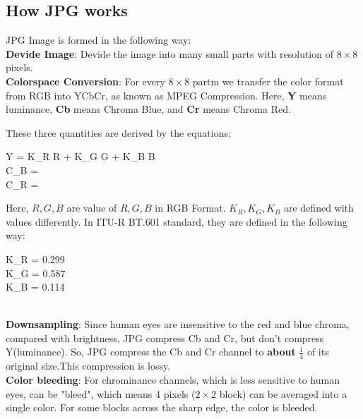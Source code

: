 \documentclass{article}
\begin{document}
	\subsection{How JPG works}
	JPG Image is formed in the following way:\\
	

	\textbf{Devide Image}:
	Devide the image into many small parts with resolution of $8 \times 8$ pixels.\\

  \textbf{Colorspace Conversion}:
	For every $8 \times 8$ partm we transfer the color format from RGB into YCbCr, as known as MPEG Compression. Here, \textbf{Y} means luminance, \textbf{Cb} means Chroma Blue, and \textbf{Cr} means Chroma Red.

	These three quantities are derived by the equations: \\


	\begin{eqnarry}
	Y = K_R \cdot R + K_G \cdot G + K_B \cdot B \\
	C_B =  \cdot {} \\
	C_R =  \cdot {} \\
	\end{eqnarry}


	Here, $R, G, B$ are value of $R,G,B$ in RGB Format. $K_R, K_G, K_B$ are defined with values differently. In ITU-R BT.601 standard, they are defined in the following way: \\


	\begin{eqnarry}
	K_R = 0.299 \\
	K_G = 0.587 \\
	K_B = 0.114 \\
	\end{eqnarry}

\cite{ref3} \\

	\textbf{Downsampling}:
		Since human eyes are insensitive to the red and blue chroma, compared with brightness, JPG compress Cb and Cr, but don't compress Y(luminance). So, JPG compress the Cb and Cr channel to \textbf{about} $\frac{1}{4}$ of its original size.This compression is lossy.\\

	\textbf{Color bleeding}:
		For chrominance channels, which is less sensitive to human eyes, can be "bleed", which means 4 pixels ($2\times 2$ block) can be averaged into a single color. For some blocks across the sharp edge, the color is bleeded. \\
\end{document}
